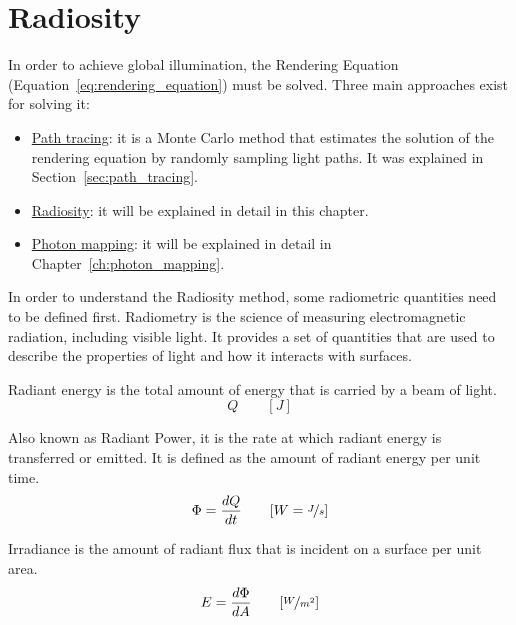 \chapter{Radiosity}\label{ch:radiosity}

In order to achieve global illumination, the Rendering Equation (Equation~\ref{eq:rendering_equation}) must be solved. Three main approaches exist for solving it:
\begin{itemize}
    \item \ul{Path tracing}: it is a Monte Carlo method that estimates the solution of the rendering equation by randomly sampling light paths. It was explained in Section~\ref{sec:path_tracing}.
    \item \ul{Radiosity}: it will be explained in detail in this chapter.
    \item \ul{Photon mapping}: it will be explained in detail in Chapter~\ref{ch:photon_mapping}.
\end{itemize}

In order to understand the Radiosity method, some radiometric quantities need to be defined first. Radiometry is the science of measuring electromagnetic radiation, including visible light. It provides a set of quantities that are used to describe the properties of light and how it interacts with surfaces.
\begin{definicion}
Radiant energy is the total amount of energy that is carried by a beam of light.
\begin{equation*}
    Q\qquad [J]
\end{equation*}
\end{definicion}

\begin{definicion}
    Also known as Radiant Power, it is the rate at which radiant energy is transferred or emitted. It is defined as the amount of radiant energy per unit time.
\begin{equation*}
    \Phi = \frac{dQ}{dt} \qquad [W=\nicefrac{J}{s}]
\end{equation*}
\end{definicion}

\begin{definicion}[Irradiance]
Irradiance is the amount of radiant flux that is incident on a surface per unit area.
\begin{equation*}
    E = \frac{d\Phi}{dA} \qquad [\nicefrac{W}{m^2}]
\end{equation*}
\end{definicion}

